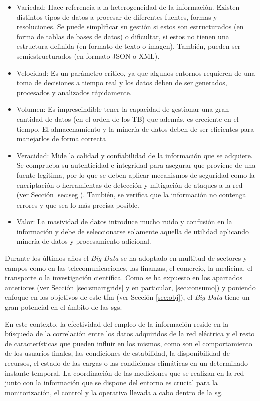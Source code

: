 \begin{itemize}
    \item Variedad: Hace referencia a la heterogeneidad de la información. Existen distintos tipos de datos a procesar de diferentes fuentes, formas y resoluciones. Se puede simplificar su gestión si estos son estructurados (en forma de tablas de bases de datos) o dificultar, si estos no tienen una estructura definida (en formato de texto o imagen). También, pueden ser semiestructurados (en formato JSON o XML).
    \item Velocidad: Es un parámetro crítico, ya que algunos entornos requieren de una toma de decisiones a tiempo real y los datos deben de ser generados, procesados y analizados rápidamente. 
    \item Volumen: Es imprescindible tener la capacidad de gestionar una gran cantidad de datos (en el orden de los TB) que además, es creciente en el tiempo. El almacenamiento y la minería de datos deben de ser eficientes para manejarlos de forma correcta 
    \item Veracidad: Mide la calidad y confiabilidad de la información que se adquiere. Se comprueba su autenticidad e integridad para asegurar que proviene de una fuente legítima, por lo que se deben aplicar mecanismos de seguridad como la encriptación o herramientas de detección y mitigación de ataques a la red (ver Sección \ref{sec:seg}). También, se verifica que la información no contenga errores y que sea lo más precisa posible.
    \item Valor: La masividad de datos introduce mucho ruido y confusión en la información y debe de seleccionarse solamente aquella de utilidad aplicando minería de datos y procesamiento adicional.
\end{itemize}

\vspace{1mm}

Durante los últimos años el \textit{Big Data} se ha adoptado en multitud de sectores y campos como en las telecomunicaciones, las finanzas, el comercio, la medicina, el transporte o la investigación científica. Como se ha expuesto en los apartados anteriores (ver Sección \ref{sec:smartgrids} y en particular, \ref{sec:consumo}) y poniendo enfoque en los objetivos de este \gls{tfm} (ver Sección \ref{sec:obj}), el \textit{Big Data} tiene un gran potencial en el ámbito de las \gls{sg}s.

\vspace{3mm}

En este contexto, la efectividad del empleo de la información reside en la búsqueda de la correlación entre los datos adquiridos de la red eléctrica y el resto de características que pueden influir en los mismos, como son el comportamiento de los usuarios finales, las condiciones de estabilidad, la disponibilidad de recursos, el estado de las cargas o las condiciones climáticas en un determinado instante temporal. La coordinación de las mediciones que se realizan en la red junto con la información que se dispone del entorno es crucial para la monitorización, el control y la operativa llevada a cabo dentro de la \gls{sg}.~\cite{stab} 

